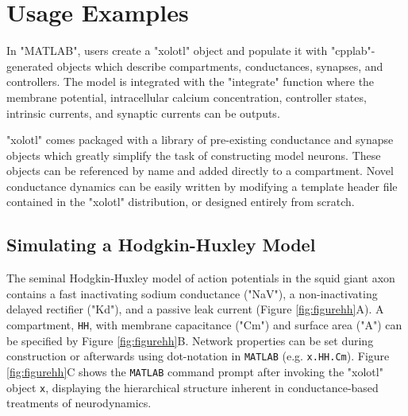 \documentclass{frontiersSCNS} %
\begin{document}
\section{Usage Examples}
\label{usage}

In "MATLAB", users create a "xolotl" object and populate it with "cpplab"-generated objects which describe compartments, conductances, synapses, and controllers. The model is integrated with the "integrate" function where the membrane potential, intracellular calcium concentration, controller states, intrinsic currents, and synaptic currents can be outputs.

"xolotl" comes packaged with a library of pre-existing conductance and synapse objects which greatly simplify the task of constructing model neurons. These objects can be referenced by name and added directly to a compartment. Novel conductance dynamics can be easily written by modifying a template header file contained in the "xolotl" distribution, or designed entirely from scratch.

%
%
%
%
%
%

\subsection{Simulating a Hodgkin-Huxley Model}

The seminal Hodgkin-Huxley model of action potentials in the squid giant axon \autocite{hodgkinComponentsMembraneConductance1952, hodgkinMeasurementCurrentvoltageRelations1952} contains a fast inactivating sodium conductance ("NaV"), a non-inactivating delayed rectifier ("Kd"), and a passive leak current (Figure \ref{fig:figurehh}A). A compartment, \texttt{HH}, with membrane capacitance ("Cm") and surface area ("A") can be specified by Figure \ref{fig:figurehh}B. Network properties can be set during construction or afterwards using dot-notation in \texttt{MATLAB} (e.g. \texttt{x.HH.Cm}). Figure \ref{fig:figurehh}C shows the \texttt{MATLAB} command prompt after invoking the "xolotl" object \texttt{x}, displaying the hierarchical structure inherent in conductance-based treatments of neurodynamics.
\end{document}
